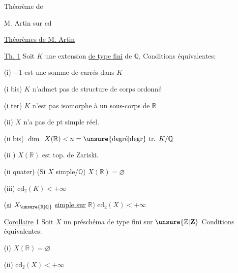Théorème de

M. Artin sur $\mathrm{cd}$


\uline{Théorèmes de M. Artin}

\uline{Th. 1} Soit $K$ une extension \uline{de type fini} de $\mathbb Q$, Conditions
équivalentes:

(i) $-1$ est une somme de carrés dans $K$

(i bis) $K$ n'admet pas de structure de corps ordonné

(i ter) $K$ n'est pas isomorphe à un sous-corps de $\mathbb R$

(ii)  $X$  n'a pas de pt simple réel.


(ii bis) 
$\dim$
$X(\mathbb R)<n=\text{\unsure{degré|degr} tr. }K/\mathbb Q$

(ii ) $X(\mathbb R)$ est  top. de Zariski.

(ii quater) (Si $X$ simple/$\mathbb Q$) \quad $X(\mathbb R)=\varnothing$

(iii) $\mathrm{cd}_2(K)<+\infty$

(\uline{si} $X_{\unsure{\mathbb R|\mathbb Q}}$ \uline{simple sur} $\mathbb R$) \quad $\mathrm{cd}_2(X)<+\infty$

\uline{Corollaire} 1 Soit $X$ un préschéma de type fini sur $\unsure{\mathbb Z|\mathbf Z}$
 Conditions équivalentes:

(i) $X(\mathbb R)=\varnothing$

(ii) $\mathrm{cd}_2(X)<+\infty$


